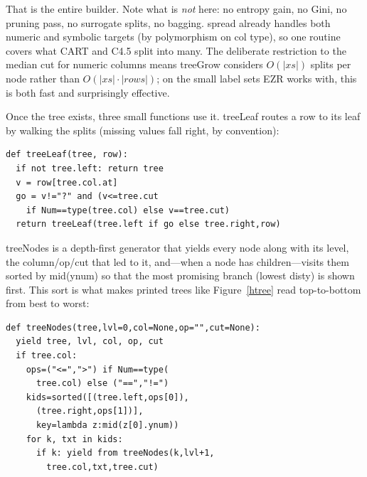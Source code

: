 That is the entire builder. Note what is {\em not} here: no entropy
gain, no Gini, no pruning pass, no surrogate splits, no bagging.
\textsf{spread} already handles both numeric and symbolic targets
(by polymorphism on \textsf{col} type), so one routine covers what
CART and C4.5 split into many. The deliberate restriction to the
median cut for numeric columns means \textsf{treeGrow} considers
$O(|\textit{xs}|)$ splits per node rather than $O(|\textit{xs}| \cdot
|\textit{rows}|)$; on the small label sets EZR works with, this is
both fast and surprisingly effective.

\smallskip

Once the tree exists, three small functions use it.
\textsf{treeLeaf} routes a row to its leaf by walking the splits
(missing values fall right, by convention):
\begin{verbatim}
def treeLeaf(tree, row): 
  if not tree.left: return tree
  v = row[tree.col.at]
  go = v!="?" and (v<=tree.cut
    if Num==type(tree.col) else v==tree.cut)
  return treeLeaf(tree.left if go else tree.right,row)
\end{verbatim}

\textsf{treeNodes} is a depth-first generator that yields every node
along with its level, the column/op/cut that led to it, and---when a
node has children---visits them sorted by \textsf{mid(ynum)} so that
the most promising branch (lowest \textsf{disty}) is shown first. This
sort is what makes printed trees like Figure~\ref{htree} read
top-to-bottom from best to worst:
\begin{verbatim}
def treeNodes(tree,lvl=0,col=None,op="",cut=None): 
  yield tree, lvl, col, op, cut
  if tree.col:
    ops=("<=",">") if Num==type(
      tree.col) else ("==","!=")
    kids=sorted([(tree.left,ops[0]),
      (tree.right,ops[1])],
      key=lambda z:mid(z[0].ynum))
    for k, txt in kids:
      if k: yield from treeNodes(k,lvl+1,
        tree.col,txt,tree.cut)
\end{verbatim}

